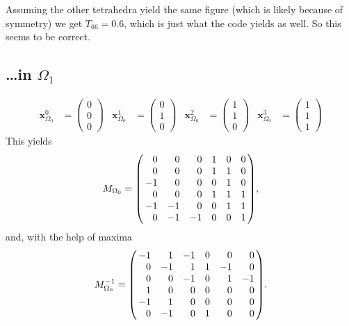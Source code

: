\documentclass{scrartcl}
\newenvironment{Matrix}[1]{\left(\mspace{-6mu}\begin{array}{*{#1}{r}}}{\end{array}\mspace{-6mu}\right)}
\newenvironment{Matrix6}{\begin{Matrix}6}{\end{Matrix}}
\begin{document}
Assuming the other tetrahedra yield the same figure (which is likely because
of symmetry) we get $T_{66}=0.6$, which is just what the code yields as well.
So this seems to be correct.

\subsection{\ldots in $\Omega_1$}
\begin{align}
  \mathbf x^0_{\Omega_0}&=\begin{pmatrix}0\\0\\0\end{pmatrix} &
  \mathbf x^1_{\Omega_0}&=\begin{pmatrix}0\\1\\0\end{pmatrix} &
  \mathbf x^2_{\Omega_0}&=\begin{pmatrix}1\\1\\0\end{pmatrix} &
  \mathbf x^3_{\Omega_0}&=\begin{pmatrix}1\\1\\1\end{pmatrix}
\end{align}
This yields
\begin{equation}
  M_{\Omega_0}=\begin{Matrix6}
     0 &  0 &  0 & 1 & 0 & 0 \\
     0 &  0 &  0 & 1 & 1 & 0 \\
    -1 &  0 &  0 & 0 & 1 & 0 \\
     0 &  0 &  0 & 1 & 1 & 1 \\
    -1 & -1 &  0 & 0 & 1 & 1 \\
     0 & -1 & -1 & 0 & 0 & 1
  \end{Matrix6},
\end{equation}
and, with the help of maxima
\begin{equation}
  M_{\Omega_0}^{-1}=\begin{Matrix6}
    -1 &  1 & -1 & 0 &  0 &  0 \\
     0 & -1 &  1 & 1 & -1 &  0 \\
     0 &  0 & -1 & 0 &  1 & -1 \\
     1 &  0 &  0 & 0 &  0 &  0 \\
    -1 &  1 &  0 & 0 &  0 &  0 \\
     0 & -1 &  0 & 1 &  0 &  0
  \end{Matrix6}.
\end{equation}
\end{document}
